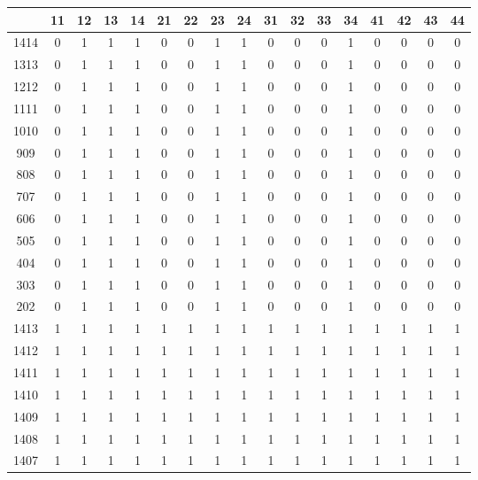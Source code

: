 \begin{itemize}
\begin{longtable}[c]{|c|c|c|c|c|c|c|c|c|c|c|c|c|c|c|c|c|}
\hline
& 11 & 12 & 13 & 14 & 21 & 22 & 23 & 24 & 31 & 32 & 33 & 34 & 41 & 42 & 43 & 44 \\ \hline
1414 & 0 & 1 & 1 & 1 & 0 & 0 & 1 & 1 & 0 & 0 & 0 & 1 & 0 & 0 & 0 & 0 \\ \hline
1313 & 0 & 1 & 1 & 1 & 0 & 0 & 1 & 1 & 0 & 0 & 0 & 1 & 0 & 0 & 0 & 0 \\ \hline
1212 & 0 & 1 & 1 & 1 & 0 & 0 & 1 & 1 & 0 & 0 & 0 & 1 & 0 & 0 & 0 & 0 \\ \hline
1111 & 0 & 1 & 1 & 1 & 0 & 0 & 1 & 1 & 0 & 0 & 0 & 1 & 0 & 0 & 0 & 0 \\ \hline
1010 & 0 & 1 & 1 & 1 & 0 & 0 & 1 & 1 & 0 & 0 & 0 & 1 & 0 & 0 & 0 & 0 \\ \hline
909 & 0 & 1 & 1 & 1 & 0 & 0 & 1 & 1 & 0 & 0 & 0 & 1 & 0 & 0 & 0 & 0 \\ \hline
808 & 0 & 1 & 1 & 1 & 0 & 0 & 1 & 1 & 0 & 0 & 0 & 1 & 0 & 0 & 0 & 0 \\ \hline
707 & 0 & 1 & 1 & 1 & 0 & 0 & 1 & 1 & 0 & 0 & 0 & 1 & 0 & 0 & 0 & 0 \\ \hline
606 & 0 & 1 & 1 & 1 & 0 & 0 & 1 & 1 & 0 & 0 & 0 & 1 & 0 & 0 & 0 & 0 \\ \hline
505 & 0 & 1 & 1 & 1 & 0 & 0 & 1 & 1 & 0 & 0 & 0 & 1 & 0 & 0 & 0 & 0 \\ \hline
404 & 0 & 1 & 1 & 1 & 0 & 0 & 1 & 1 & 0 & 0 & 0 & 1 & 0 & 0 & 0 & 0 \\ \hline
303 & 0 & 1 & 1 & 1 & 0 & 0 & 1 & 1 & 0 & 0 & 0 & 1 & 0 & 0 & 0 & 0 \\ \hline
202 & 0 & 1 & 1 & 1 & 0 & 0 & 1 & 1 & 0 & 0 & 0 & 1 & 0 & 0 & 0 & 0 \\ \hline
1413 & 1 & 1 & 1 & 1 & 1 & 1 & 1 & 1 & 1 & 1 & 1 & 1 & 1 & 1 & 1 & 1 \\ \hline
1412 & 1 & 1 & 1 & 1 & 1 & 1 & 1 & 1 & 1 & 1 & 1 & 1 & 1 & 1 & 1 & 1 \\ \hline
1411 & 1 & 1 & 1 & 1 & 1 & 1 & 1 & 1 & 1 & 1 & 1 & 1 & 1 & 1 & 1 & 1 \\ \hline
1410 & 1 & 1 & 1 & 1 & 1 & 1 & 1 & 1 & 1 & 1 & 1 & 1 & 1 & 1 & 1 & 1 \\ \hline
1409 & 1 & 1 & 1 & 1 & 1 & 1 & 1 & 1 & 1 & 1 & 1 & 1 & 1 & 1 & 1 & 1 \\ \hline
1408 & 1 & 1 & 1 & 1 & 1 & 1 & 1 & 1 & 1 & 1 & 1 & 1 & 1 & 1 & 1 & 1 \\ \hline
1407 & 1 & 1 & 1 & 1 & 1 & 1 & 1 & 1 & 1 & 1 & 1 & 1 & 1 & 1 & 1 & 1 \\ \hline

\end{longtable}
\end{itemize}
